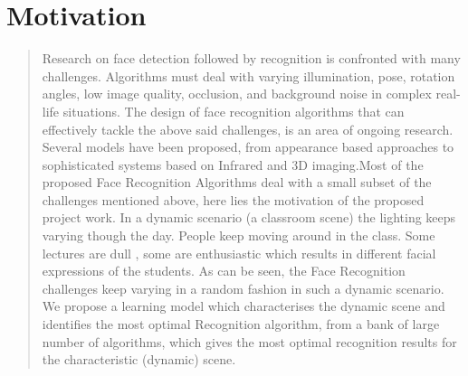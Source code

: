 \section*{Motivation}
\begin{quote}
Research on face detection followed by recognition is confronted with many challenges. Algorithms must deal with varying illumination, pose, rotation angles, low image quality, occlusion, and background noise in complex real-life situations. The design of face recognition algorithms that can effectively tackle the above said challenges, is an area of ongoing research. Several models have been proposed, from appearance based approaches to sophisticated systems based on Infrared and 3D imaging.Most of the proposed Face Recognition Algorithms deal with a small subset of the challenges mentioned above, here lies the motivation of the proposed project work. In a dynamic scenario (a classroom scene) the lighting keeps varying though the day. People keep moving around in the class. Some lectures are dull , some are enthusiastic which results in different facial expressions of the students. As can be seen, the Face Recognition challenges keep varying in a random fashion in such a dynamic scenario. We propose a learning model which characterises the dynamic scene and identifies the most optimal Recognition algorithm, from a bank of large number of algorithms, which gives the most optimal recognition results for the characteristic (dynamic) scene.
\end{quote}
